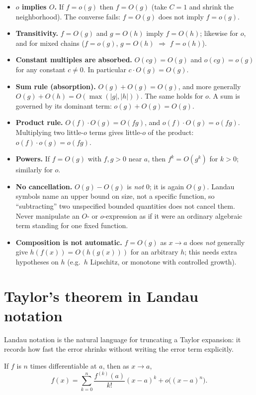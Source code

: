 \documentclass{essay}
\begin{document}
\begin{itemize}
  \item \textbf{\(o\) implies \(O\).} If \(f=o(g)\) then \(f=O(g)\) (take \(C=1\) and shrink the neighborhood). The converse fails: \(f=O(g)\) does not imply \(f=o(g)\).
  \item \textbf{Transitivity.} \(f=O(g)\) and \(g=O(h)\) imply \(f=O(h)\); likewise for \(o\), and for mixed chains (\(f=o(g)\), \(g=O(h)\) \(\Rightarrow\) \(f=o(h)\)).
  \item \textbf{Constant multiples are absorbed.} \(O(cg)=O(g)\) and \(o(cg)=o(g)\) for any constant \(c\neq 0\). In particular \(c\cdot O(g) = O(g)\).
  \item \textbf{Sum rule (absorption).} \(O(g)+O(g)=O(g)\), and more generally \(O(g)+O(h) = O(\max(|g|,|h|))\). The same holds for \(o\). A sum is governed by its dominant term: \(o(g)+O(g)=O(g)\).
  \item \textbf{Product rule.} \(O(f)\cdot O(g) = O(fg)\), and \(o(f)\cdot O(g) = o(fg)\). Multiplying two little-\(o\) terms gives little-\(o\) of the product: \(o(f)\cdot o(g) = o(fg)\).
  \item \textbf{Powers.} If \(f=O(g)\) with \(f,g>0\) near \(a\), then \(f^{k} = O(g^{k})\) for \(k>0\); similarly for \(o\).
  \item \textbf{No cancellation.} \(O(g)-O(g)\) is \emph{not} \(0\); it is again \(O(g)\). Landau symbols name an upper bound on size, not a specific function, so ``subtracting'' two unspecified bounded quantities does not cancel them. Never manipulate an \(O\)- or \(o\)-expression as if it were an ordinary algebraic term standing for one fixed function.
  \item \textbf{Composition is not automatic.} \(f=O(g)\) as \(x\to a\) does \emph{not} generally give \(h(f(x)) = O(h(g(x)))\) for an arbitrary \(h\); this needs extra hypotheses on \(h\) (e.g.\ \(h\) Lipschitz, or monotone with controlled growth).
\end{itemize}

\section{Taylor's theorem in Landau notation}

Landau notation is the natural language for truncating a Taylor expansion: it records how fast the error shrinks without writing the error term explicitly.

\begin{theorem}
  If \(f\) is \(n\) times differentiable at \(a\), then as \(x\to a\),
  \[ f(x) = \sum_{k=0}^{n} \frac{f^{(k)}(a)}{k!}(x-a)^{k} + o\big((x-a)^{n}\big). \]
\end{theorem}
\end{document}
